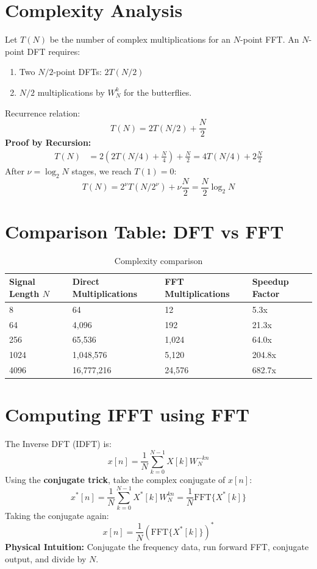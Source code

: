 \documentclass[11pt,a4paper]{article}
\begin{document}
\section{Complexity Analysis}
Let $T(N)$ be the number of complex multiplications for an $N$-point FFT.
An $N$-point DFT requires:
\begin{enumerate}
    \item Two $N/2$-point DFTs: $2 T(N/2)$
    \item $N/2$ multiplications by $W_N^k$ for the butterflies.
\end{enumerate}
Recurrence relation:
\begin{equation}
T(N) = 2T(N/2) + \frac{N}{2}
\end{equation}
\textbf{Proof by Recursion:}
\begin{align*}
T(N) &= 2 \left( 2T(N/4) + \frac{N}{4} \right) + \frac{N}{2} = 4T(N/4) + 2\frac{N}{2}
\end{align*}
After $\nu = \log_2 N$ stages, we reach $T(1) = 0$:
\begin{equation}
T(N) = 2^{\nu}T(N/2^{\nu}) + \nu \frac{N}{2} = \frac{N}{2}\log_2 N
\end{equation}

\section{Comparison Table: DFT vs FFT}
\begin{table}[H]
\centering
\begin{tabular}{@{}llll@{}}
\toprule
\textbf{Signal Length $N$} & \textbf{Direct Multiplications} & \textbf{FFT Multiplications} & \textbf{Speedup Factor} \\ \midrule
8 & 64 & 12 & 5.3x \\
64 & 4,096 & 192 & 21.3x \\
256 & 65,536 & 1,024 & 64.0x \\
1024 & 1,048,576 & 5,120 & 204.8x \\
4096 & 16,777,216 & 24,576 & 682.7x \\ \bottomrule
\end{tabular}
\caption{Complexity comparison}
\end{table}

\section{Computing IFFT using FFT}
The Inverse DFT (IDFT) is:
\begin{equation}
x[n] = \frac{1}{N} \sum_{k=0}^{N-1} X[k] W_N^{-kn}
\end{equation}
Using the \textbf{conjugate trick}, take the complex conjugate of $x[n]$:
\begin{equation}
x^*[n] = \frac{1}{N} \sum_{k=0}^{N-1} X^*[k] W_N^{kn} = \frac{1}{N} \text{FFT}\{X^*[k]\}
\end{equation}
Taking the conjugate again:
\begin{equation}
x[n] = \frac{1}{N} \left( \text{FFT}\{X^*[k]\} \right)^*
\end{equation}
\textbf{Physical Intuition:} Conjugate the frequency data, run forward FFT, conjugate output, and divide by $N$.
\end{document}
